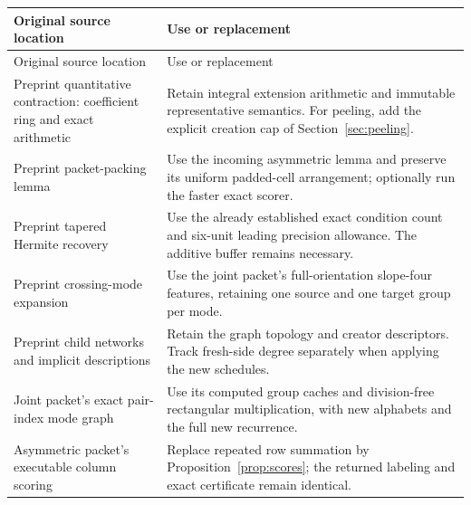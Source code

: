\begin{longtable}{@{}>{\raggedright\arraybackslash}p{}>{\raggedright\arraybackslash}p{}@{}}
\toprule Original source location & Use or replacement\\\midrule\endfirsthead
\toprule Original source location & Use or replacement\\\midrule\endhead
Preprint quantitative contraction: coefficient ring and exact arithmetic &
Retain integral extension arithmetic and immutable representative semantics.
For peeling, add the explicit creation cap of Section~\ref{sec:peeling}.\\[4pt]
Preprint packet-packing lemma &
Use the incoming asymmetric lemma and preserve its uniform padded-cell
arrangement; optionally run the faster exact scorer.\\[4pt]
Preprint tapered Hermite recovery &
Use the already established exact condition count and six-unit leading
precision allowance. The additive buffer remains necessary.\\[4pt]
Preprint crossing-mode expansion &
Use the joint packet's full-orientation slope-four features, retaining
one source and one target group per mode.\\[4pt]
Preprint child networks and implicit descriptions &
Retain the graph topology and creator descriptors. Track fresh-side degree
separately when applying the new schedules.\\[4pt]
Joint packet's exact pair-index mode graph &
Use its computed group caches and division-free rectangular multiplication,
with new alphabets and the full new recurrence.\\[4pt]
Asymmetric packet's executable column scoring &
Replace repeated row summation by Proposition~\ref{prop:scores}; the
returned labeling and exact certificate remain identical.\\\bottomrule
\end{longtable}
